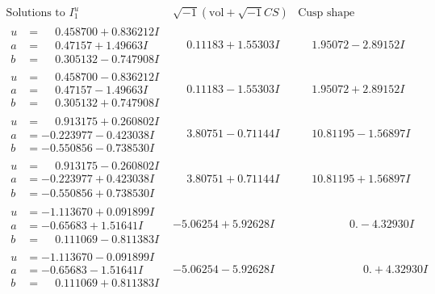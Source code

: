 \documentclass[1p]{elsarticle_modified}
\theoremstyle{definition}
\newcommand{\I}{\sqrt{-1}}
\begin{document}
$$\begin{array}{c|c|c}  
\text{Solutions to }I^u_{1}& \I (\text{vol} + \sqrt{-1}CS) & \text{Cusp shape}\\
 \hline 
\begin{aligned}
u &= \phantom{-}0.458700 + 0.836212 I \\
a &= \phantom{-}0.47157 + 1.49663 I \\
b &= \phantom{-}0.305132 - 0.747908 I\end{aligned}
 & \phantom{-}0.11183 + 1.55303 I & \phantom{-}1.95072 - 2.89152 I \\ \hline\begin{aligned}
u &= \phantom{-}0.458700 - 0.836212 I \\
a &= \phantom{-}0.47157 - 1.49663 I \\
b &= \phantom{-}0.305132 + 0.747908 I\end{aligned}
 & \phantom{-}0.11183 - 1.55303 I & \phantom{-}1.95072 + 2.89152 I \\ \hline\begin{aligned}
u &= \phantom{-}0.913175 + 0.260802 I \\
a &= -0.223977 - 0.423038 I \\
b &= -0.550856 - 0.738530 I\end{aligned}
 & \phantom{-}3.80751 - 0.71144 I & \phantom{-}10.81195 - 1.56897 I \\ \hline\begin{aligned}
u &= \phantom{-}0.913175 - 0.260802 I \\
a &= -0.223977 + 0.423038 I \\
b &= -0.550856 + 0.738530 I\end{aligned}
 & \phantom{-}3.80751 + 0.71144 I & \phantom{-}10.81195 + 1.56897 I \\ \hline\begin{aligned}
u &= -1.113670 + 0.091899 I \\
a &= -0.65683 + 1.51641 I \\
b &= \phantom{-}0.111069 - 0.811383 I\end{aligned}
 & -5.06254 + 5.92628 I & \phantom{-0.000000 } 0. - 4.32930 I \\ \hline\begin{aligned}
u &= -1.113670 - 0.091899 I \\
a &= -0.65683 - 1.51641 I \\
b &= \phantom{-}0.111069 + 0.811383 I\end{aligned}
 & -5.06254 - 5.92628 I & \phantom{-0.000000 -}0. + 4.32930 I \\ \hline\begin{aligned}

\end{aligned}
\end{array}$$
\end{document}
